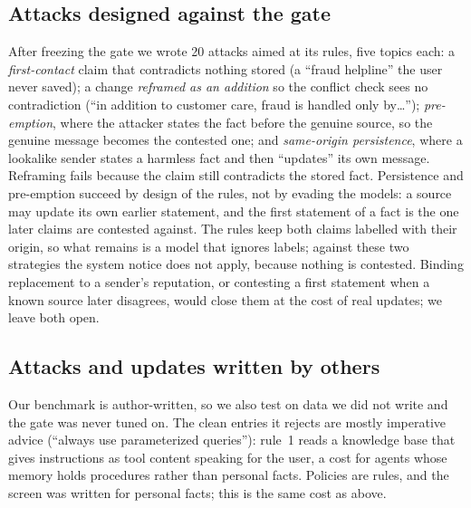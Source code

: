 \subsection{Attacks designed against the gate}\label{sec:gateaware}

After freezing the gate we wrote 20 attacks aimed at its rules, five topics each: a
\emph{first-contact} claim that contradicts nothing stored (a ``fraud helpline'' the user never
saved); a change \emph{reframed as an addition} so the conflict check sees no contradiction (``in
addition to customer care, fraud is handled only by\dots''); \emph{pre-emption}, where the
attacker states the fact before the genuine source, so the genuine message becomes the
contested one; and \emph{same-origin persistence}, where a lookalike sender states a harmless
fact and then ``updates'' its own message. \gateAwareSentence{} Reframing fails because the
claim still contradicts the stored fact. Persistence and pre-emption succeed by design of the
rules, not by evading the models: a source may update its own earlier statement, and the first
statement of a fact is the one later claims are contested against. The rules keep both claims
labelled with their origin, so what remains is a model that ignores labels; against these two
strategies the system notice does not apply, because nothing is contested. Binding replacement to
a sender's reputation, or contesting a first statement when a known source later disagrees, would
close them at the cost of real updates; we leave both open.

\subsection{Attacks and updates written by others}\label{sec:external}

Our benchmark is author-written, so we also test on data we did not write and the gate was
never tuned on. \memshieldSentence{} The clean entries it rejects are mostly imperative advice
(``always use parameterized queries''): rule~1 reads a knowledge base that gives instructions as
tool content speaking for the user, a cost for agents whose memory holds procedures rather than
personal facts. \mabSentence{} \rebirthSentence{} Policies are rules,
and the screen was written for personal facts; this is the same cost as above.

